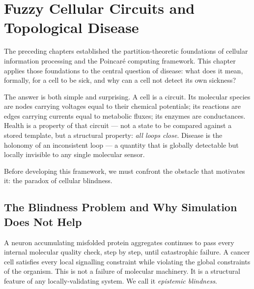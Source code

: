 ﻿%

\chapter{Fuzzy Cellular Circuits and Topological Disease}
\label{ch:fuzzy-circuits}
\label{ch:disease-circuits}


The preceding chapters established the partition-theoretic foundations of
cellular information processing and the Poincar\'{e} computing framework.
This chapter applies those foundations to the central question of disease:
what does it mean, formally, for a cell to be sick, and why can a cell not
detect its own sickness?

The answer is both simple and surprising.  A cell is a circuit.  Its
molecular species are nodes carrying voltages equal to their chemical
potentials; its reactions are edges carrying currents equal to metabolic
fluxes; its enzymes are conductances.  Health is a property of that
circuit --- not a state to be compared against a stored template, but
a structural property: \emph{all loops close}.  Disease is the holonomy
of an inconsistent loop --- a quantity that is globally detectable but
locally invisible to any single molecular sensor.

Before developing this framework, we must confront the obstacle that
motivates it: the paradox of cellular blindness.


\section{The Blindness Problem and Why Simulation Does Not Help}
\label{sec:blindness}

A neuron accumulating misfolded protein aggregates continues to pass every
internal molecular quality check, step by step, until catastrophic failure.
A cancer cell satisfies every local signalling constraint while violating
the global constraints of the organism.  This is not a failure of molecular
machinery.  It is a structural feature of any locally-validating system.
We call it \emph{epistemic blindness}.

